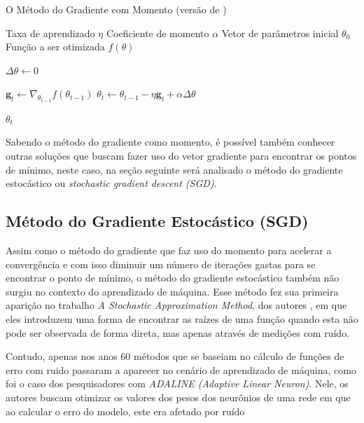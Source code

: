 \begin{algorithm}[H] %
    \caption{O Método do Gradiente com Momento (versão de \parencite{BackpropagationArticle})}
    \label{alg:metodo-do-gradiente-com-momento}
    \begin{algorithmic}[1] %

    \Require Taxa de aprendizado $\eta$
    \Require Coeficiente de momento $\alpha$
    \Require Vetor de parâmetros inicial $\theta_0$
    \Require Função a ser otimizada $f(\theta)$

    \State $\Delta \theta \gets 0$ 

        \State $\textbf{g}_t \leftarrow \nabla_{\theta_{t-1}} f(\theta_{t-1})$
        \State $\theta_t \leftarrow \theta_{t-1} - \eta \textbf{g}_t + \alpha \Delta \theta$
    \EndWhile

    \State \Return $\theta_t$ 
    \end{algorithmic}
\end{algorithm}

Sabendo o método do gradiente como momento, é possível também conhecer outras soluções que buscam fazer uso do vetor gradiente para encontrar os pontos de mínimo, neste caso, na seção seguinte será analisado o método do gradiente estocástico ou \textit{stochastic gradient descent (SGD)}.

\subsection{Método do Gradiente Estocástico (SGD)}

Assim como o método do gradiente que faz uso do momento para acelerar a convergência e com isso diminuir um número de iterações gastas para se encontrar o ponto de mínimo, o método do gradiente estocástico também não surgiu no contexto do aprendizado de máquina. Esse método fez sua primeira aparição no trabalho \textit{A Stochastic Approximation Method}, dos autores \textcite{StochasticGradientDescentMethod}, em que eles introduzem uma forma de encontrar as raízes de uma função quando esta não pode ser observada de forma direta, mas apenas através de medições com ruído.

Contudo, apenas nos anos 60 métodos que se baseiam no cálculo de funções de erro com ruido passaram a aparecer no cenário de aprendizado de máquina, como foi o caso dos pesquisadores \textcite{Adeline} com \textit{ADALINE (Adaptive Linear Neuron)}. Nele, os autores buscam otimizar os valores dos pesos dos neurônios de uma rede em que ao calcular o erro do modelo, este era afetado por ruído \parencite{Adeline}

